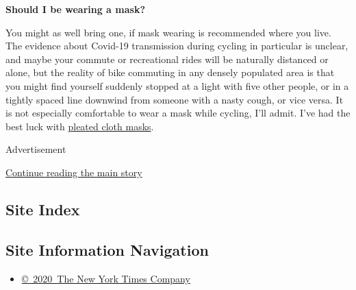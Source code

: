 \textbf{Should I be wearing a mask?}

You might as well bring one, if mask wearing is recommended where you
live. The evidence about Covid-19 transmission during cycling in
particular is unclear, and maybe your commute or recreational rides will
be naturally distanced or alone, but the reality of bike commuting in
any densely populated area is that you might find yourself suddenly
stopped at a light with five other people, or in a tightly spaced line
downwind from someone with a nasty cough, or vice versa. It is not
especially comfortable to wear a mask while cycling, I'll admit. I've
had the best luck with
\href{https://www.nytimes3xbfgragh.onion/article/how-to-make-face-mask-coronavirus.html}{pleated
cloth masks}.

Advertisement

\protect\hyperlink{after-bottom}{Continue reading the main story}

\hypertarget{site-index}{%
\subsection{Site Index}\label{site-index}}

\hypertarget{site-information-navigation}{%
\subsection{Site Information
Navigation}\label{site-information-navigation}}

\begin{itemize}
\tightlist
\item
  \href{https://help.nytimes3xbfgragh.onion/hc/en-us/articles/115014792127-Copyright-notice}{©~2020~The
  New York Times Company}
\end{itemize}

